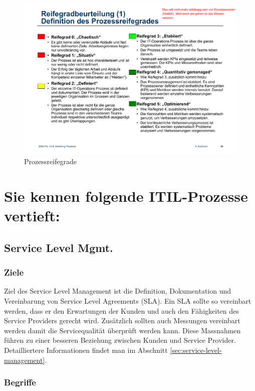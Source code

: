 \begin{figure}
\centering
\includegraphics[width=\linewidth]{fig/prozessreifegrad}
\caption{Prozessreifegrade}
\label{fig:prozessreifegrad}
\end{figure}


\section{Sie kennen folgende ITIL-Prozesse vertieft:} 

\subsection{Service Level Mgmt.}

\subsubsection{Ziele}

Ziel des Service Level Management ist die Definition, Dokumentation und Vereinbarung von Service Level Agreements (SLA). Ein SLA sollte so vereinbart werden, dass er den Erwartungen der Kunden und auch den Fähigkeiten des Service Providers gerecht wird. Zusätzlich sollten auch Messungen vereinbart werden damit die Servicequalität überprüft werden kann. Diese Massnahmen führen zu einer besseren Beziehung zwischen Kunden und Service Provider. Detailliertere Informationen findet man im Abschnitt \ref{sec:service-level-management}.

\subsubsection{Begriffe}

